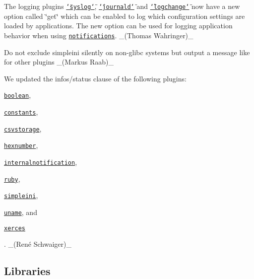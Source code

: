 \begin{DoxyItemize}
\item The logging plugins \href{https://www.libelektra.org/plugins/syslog}{\tt \char`\"{}syslog\char`\"{}}, \href{https://www.libelektra.org/plugins/journald}{\tt \char`\"{}journald\char`\"{}} and \href{https://www.libelektra.org/plugins/logchange}{\tt \char`\"{}logchange\char`\"{}} now have a new option called \char`\"{}get\char`\"{} which can be enabled to log which configuration settings are loaded by applications. The new option can be used for logging application behavior when using \href{https://www.libelektra.org/tutorials/notifications}{\tt notifications}. \+\_\+(\+Thomas Wahringer)\+\_\+
\item Do not exclude {\ttfamily simpleini} silently on non-\/glibc systems but output a message like for other plugins \+\_\+(\+Markus Raab)\+\_\+
\item We updated the {\ttfamily infos/status} clause of the following plugins\+:
\begin{DoxyItemize}
\item \href{http://libelektra.org/plugins/boolean}{\tt {\ttfamily boolean}},
\item \href{http://libelektra.org/plugins/constants}{\tt {\ttfamily constants}},
\item \href{http://libelektra.org/plugins/csvstorage}{\tt {\ttfamily csvstorage}},
\item \href{http://libelektra.org/plugins/hexnumber}{\tt {\ttfamily hexnumber}},
\item \href{http://libelektra.org/plugins/internalnotification}{\tt {\ttfamily internalnotification}},
\item \href{http://libelektra.org/plugins/ruby}{\tt {\ttfamily ruby}},
\item \href{http://libelektra.org/plugins/simpleini}{\tt {\ttfamily simpleini}},
\item \href{http://libelektra.org/plugins/uname}{\tt {\ttfamily uname}}, and
\item \href{http://libelektra.org/plugins/xerces}{\tt {\ttfamily xerces}}
\end{DoxyItemize}

. \+\_\+(René Schwaiger)\+\_\+
\end{DoxyItemize}

\subsection*{Libraries}

